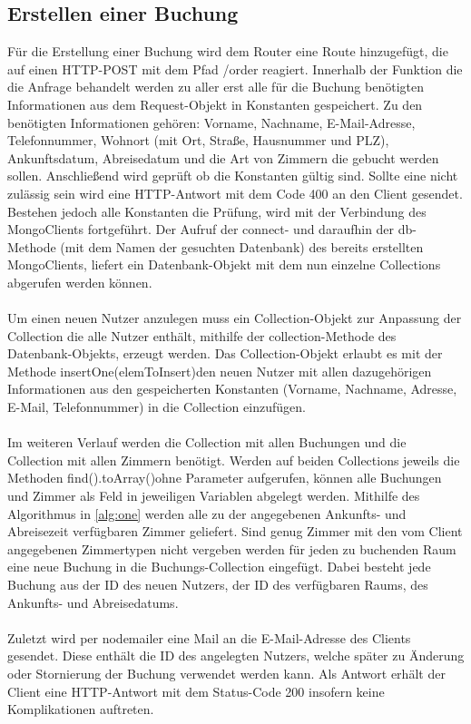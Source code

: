 \subsection{Erstellen einer Buchung}
Für die Erstellung einer Buchung wird dem Router eine Route hinzugefügt, die auf einen HTTP-POST mit dem Pfad \glqq /order \grqq \thinspace reagiert. Innerhalb der Funktion die die Anfrage behandelt werden zu aller erst alle für die Buchung benötigten Informationen aus dem Request-Objekt in Konstanten gespeichert. Zu den benötigten Informationen gehören: Vorname, Nachname, E-Mail-Adresse, Telefonnummer, Wohnort (mit Ort, Straße, Hausnummer und PLZ), Ankunftsdatum, Abreisedatum und die Art von Zimmern die gebucht werden sollen. Anschließend wird geprüft ob die Konstanten gültig sind. Sollte eine nicht zulässig sein wird eine HTTP-Antwort mit dem Code 400 an den Client gesendet. Bestehen jedoch alle Konstanten die Prüfung, wird mit der Verbindung des MongoClients fortgeführt. Der Aufruf der \glqq connect\grqq- und daraufhin der \glqq db\grqq-Methode (mit dem Namen der gesuchten Datenbank) des bereits erstellten MongoClients, liefert ein Datenbank-Objekt mit dem nun einzelne Collections abgerufen werden können. 
\\
\\
Um einen neuen Nutzer anzulegen muss ein Collection-Objekt zur Anpassung der Collection die alle Nutzer enthält, mithilfe der \glqq collection\grqq -Methode des Datenbank-Objekts, erzeugt werden. Das Collection-Objekt erlaubt es mit der Methode \glqq insertOne(elemToInsert)\grqq \thinspace den neuen Nutzer mit allen dazugehörigen Informationen aus den gespeicherten Konstanten (Vorname, Nachname, Adresse, E-Mail, Telefonnummer) in die Collection einzufügen.
\\
\\
Im weiteren Verlauf werden die Collection mit allen Buchungen und die Collection mit allen Zimmern benötigt. Werden auf beiden Collections jeweils die Methoden \glqq find().toArray()\grqq \thinspace ohne Parameter aufgerufen, können alle Buchungen und Zimmer als Feld in jeweiligen Variablen abgelegt werden. Mithilfe des Algorithmus in \ref{alg:one} werden alle zu der angegebenen Ankunfts- und Abreisezeit verfügbaren Zimmer geliefert. Sind genug Zimmer mit den vom Client angegebenen Zimmertypen nicht vergeben werden für jeden zu buchenden Raum eine neue Buchung in die Buchungs-Collection eingefügt. Dabei besteht jede Buchung aus der ID des neuen Nutzers, der ID des verfügbaren Raums, des Ankunfts- und Abreisedatums.
\\
\\
Zuletzt wird per nodemailer eine Mail an die E-Mail-Adresse des Clients gesendet. Diese enthält die ID des angelegten Nutzers, welche später zu Änderung oder Stornierung der Buchung verwendet werden kann. Als Antwort erhält der Client eine HTTP-Antwort mit dem Status-Code 200 insofern keine Komplikationen auftreten.

